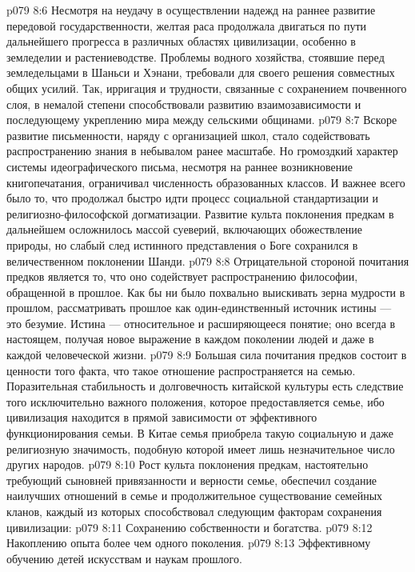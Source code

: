 \vs p079 8:6 Несмотря на неудачу в осуществлении надежд на раннее развитие передовой государственности, желтая раса продолжала двигаться по пути дальнейшего прогресса в различных областях цивилизации, особенно в земледелии и растениеводстве. Проблемы водного хозяйства, стоявшие перед земледельцами в Шаньси и Хэнани, требовали для своего решения совместных общих усилий. Так, ирригация и трудности, связанные с сохранением почвенного слоя, в немалой степени способствовали развитию взаимозависимости и последующему укреплению мира между сельскими общинами.
\vs p079 8:7 Вскоре развитие письменности, наряду с организацией школ, стало содействовать распространению знания в небывалом ранее масштабе. Но громоздкий характер системы идеографического письма, несмотря на раннее возникновение книгопечатания, ограничивал численность образованных классов. И важнее всего было то, что продолжал быстро идти процесс социальной стандартизации и религиозно\hyp{}философской догматизации. Развитие культа поклонения предкам в дальнейшем осложнилось массой суеверий, включающих обожествление природы, но слабый след истинного представления о Боге сохранился в величественном поклонении Шанди.
\vs p079 8:8 Отрицательной стороной почитания предков является то, что оно содействует распространению философии, обращенной в прошлое. Как бы ни было похвально выискивать зерна мудрости в прошлом, рассматривать прошлое как один\hyp{}единственный источник истины --- это безумие. Истина --- относительное и расширяющееся понятие; оно  всегда в настоящем, получая новое выражение в каждом поколении людей и даже в каждой человеческой жизни.
\vs p079 8:9 Большая сила почитания предков состоит в ценности того факта, что такое отношение распространяется на семью. Поразительная стабильность и долговечность китайской культуры есть следствие того исключительно важного положения, которое предоставляется семье, ибо цивилизация находится в прямой зависимости от эффективного функционирования семьи. В Китае семья приобрела такую социальную и даже религиозную значимость, подобную которой имеет лишь незначительное число других народов.
\vs p079 8:10 Рост культа поклонения предкам, настоятельно требующий сыновней привязанности и верности семье, обеспечил создание наилучших отношений в семье и продолжительное существование семейных кланов, каждый из которых способствовал следующим факторам сохранения цивилизации:
\vs p079 8:11 \bibnobreakspace Сохранению собственности и богатства.
\vs p079 8:12 \bibnobreakspace Накоплению опыта более чем одного поколения.
\vs p079 8:13 \bibnobreakspace Эффективному обучению детей искусствам и наукам прошлого.
